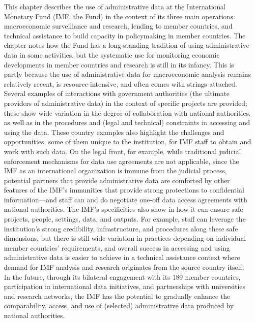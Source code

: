 This chapter describes the use of administrative data at the International Monetary Fund (IMF, the Fund) in the context of its three main operations: macroeconomic surveillance and research, lending to member countries, and technical assistance to build capacity in policymaking in member countries. The chapter notes how the Fund has a long-standing tradition of using administrative data in some activities, but the systematic use for monitoring economic developments in member countries and research is still in its infancy. This is partly because the use of administrative data for macroeconomic analysis remains relatively recent, is resource-intensive, and often comes with strings attached. Several examples of interactions with government authorities (the ultimate providers of administrative data) in the context of specific projects are provided; these show wide variation in the degree of collaboration with national authorities, as well as in the procedures and (legal and technical) constraints in accessing and using the data. These country examples also highlight the challenges and opportunities, some of them unique to the institution, for IMF staff to obtain and work with such data. On the legal front, for example, while traditional judicial enforcement mechanisms for data use agreements are not applicable, since the IMF as an international organization is immune from the judicial process, potential partners that provide administrative data are comforted by other features of the IMF's immunities that provide strong protections to confidential information---and staff can and do negotiate one-off data access agreements with national authorities. The IMF's specificities also show in how it can ensure safe projects, people, settings, data, and outputs. For example, staff can leverage the institution's strong credibility, infrastructure, and procedures along these safe dimensions, but there is still wide variation in practices depending on individual member countries' requirements, and overall success in accessing and using administrative data is easier to achieve in a technical assistance context where demand for IMF analysis and research originates from the source country itself. In the future, through its bilateral engagement with its 189 member countries, participation in international data initiatives, and partnerships with universities and research networks, the IMF has the potential to gradually enhance the comparability, access, and use of (selected) administrative data produced by national authorities.

